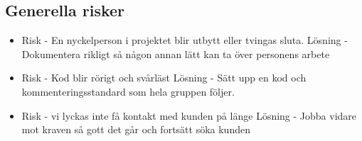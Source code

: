 \subsection{Generella risker}
\begin{itemize}
\item Risk - En nyckelperson i projektet blir utbytt eller tvingas sluta.
Lösning - Dokumentera rikligt så någon annan lätt kan ta över personens arbete
\item Risk - Kod blir rörigt och svårläst
Lösning - Sätt upp en kod och kommenteringsstandard som hela gruppen följer.
\item Risk - vi lyckas inte få kontakt med kunden på länge
Lösning - Jobba vidare mot kraven så gott det går och fortsätt söka kunden
\end{itemize}



